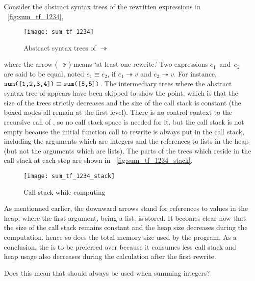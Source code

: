Consider the abstract syntax trees of the rewritten expressions in
\fig~\vref{fig:sum_tf_1234},
\begin{figure}[t]
\centering
\texttt{[image: sum\_tf\_1234]}
\caption{Abstract syntax trees of 
    \(\twoheadrightarrow\)  \label{fig:sum_tf_1234}}
\end{figure}
where the arrow (\(\twoheadrightarrow\)) means `at least one rewrite.'
Two expressions \(e_1\)~and~\(e_2\) are said to be equal, noted \(e_1
\mathrel{\equiv} e_2\), if \(e_1 \twoheadrightarrow v\) and \(e_2
\twoheadrightarrow v\). For instance, \(\texttt{sum([1,2,3,4])}
\mathrel{\equiv} \texttt{sum([5,5])}\). The intermediary trees where
the abstract syntax tree of  appears have been skipped to
show the point, which is that the size of the trees strictly decreases
and the size of the call stack is constant (the boxed nodes all remain
at the first level). There is no control context to the recursive call
of , so no call stack space is needed for it, but
the call stack is not empty because the initial function call to
rewrite is always put in the call stack, including the arguments which
are integers and the references to lists in the heap (but not the
arguments which are lists). The parts of the trees which reside in the
call stack at each step are shown in
\fig~\vref{fig:sum_tf_1234_stack}.
\begin{figure}[h]
\centering
\texttt{[image: sum\_tf\_1234\_stack]}
\caption{Call stack while computing 
\label{fig:sum_tf_1234_stack}}
\end{figure}
As mentionned earlier, the downward arrows stand for references to
values in the heap, where the first argument, being a list, is
stored. It becomes clear now that the size of the call stack remains
constant and the heap size decreases during the computation, hence so
does the total memory size used by the program. As a conclusion, the
 is to be preferred over  because it
consumes less call stack and heap usage also decreases during the
calculation after the first rewrite.

Does this mean that  should always be used when
summing integers?

